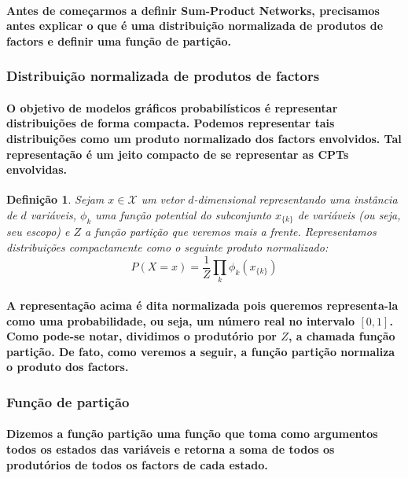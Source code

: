 \documentclass[a4paper,10pt]{article}
\theoremstyle{plain}
\newtheorem*{spn-def}{Definição}
\begin{document}
\paragraph{
  Antes de começarmos a definir Sum-Product Networks, precisamos antes explicar o que é uma
  distribuição normalizada de produtos de factors e definir uma função de partição.
}

\subsubsection{Distribuição normalizada de produtos de factors}

\paragraph{
  O objetivo de modelos gráficos probabilísticos é representar distribuições de forma compacta.
  Podemos representar tais distribuições como um produto normalizado dos factors\cite{report-2}
  envolvidos. Tal representação é um jeito compacto de se representar as CPTs envolvidas.
}

\begin{spn-def} Sejam $x \in \mathcal{X}$ um vetor $d$-dimensional representando uma instância de
  $d$ variáveis, $\phi_k$ uma função potential\cite{report-2} do subconjunto $x_{\{k\}}$ de
  variáveis (ou seja, seu escopo\cite{project-def}) e $Z$ a função partição que veremos mais a
  frente. Representamos distribuições compactamente como o seguinte produto normalizado:
  \begin{equation}
    P(X = x) = \frac{1}{Z} \prod_k \phi_k (x_{\{k\}})
  \end{equation}
\end{spn-def}

\paragraph{
  A representação acima é dita normalizada pois queremos representa-la como uma probabilidade, ou
  seja, um número real no intervalo $[0, 1]$. Como pode-se notar, dividimos o produtório por $Z$,
  a chamada função partição. De fato, como veremos a seguir, a função partição normaliza o produto
  dos factors.
}

\subsubsection{Função de partição}

\paragraph{
  Dizemos a função partição uma função que toma como argumentos todos os estados das variáveis e
  retorna a soma de todos os produtórios de todos os factors de cada estado.
}
\end{document}
